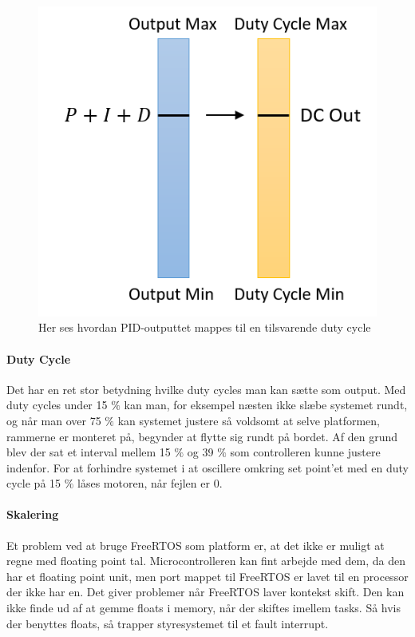 \begin{figure}
	\begin{center}
	\includegraphics[scale=0.8]{Billeder/Mapping.png}
	\end{center}		
	\caption{Her ses hvordan PID-outputtet mappes til en tilsvarende duty cycle}
	\label{fig:Mapping}	
\end{figure}
\paragraph{Duty Cycle}

Det har en ret stor betydning hvilke duty cycles man kan sætte som output. Med duty cycles under 15 $\%$ kan man, for eksempel næsten ikke slæbe systemet rundt, og når man over 75 $\%$ kan systemet justere så voldsomt at selve platformen, rammerne er monteret på, begynder at flytte sig rundt på bordet. Af den grund blev der sat et interval mellem 15 $\%$ og 39 $\%$ som controlleren kunne justere indenfor. For at forhindre systemet i at oscillere omkring set point'et med en duty cycle på 15 $\%$ låses motoren, når fejlen er 0.

\paragraph{Skalering}

Et problem ved at bruge FreeRTOS som platform er, at det ikke er muligt at regne med floating point tal. Microcontrolleren kan fint arbejde med dem, da den har et floating point unit, men port mappet til FreeRTOS er lavet til en processor der ikke har en. Det giver problemer når FreeRTOS laver kontekst skift. Den kan ikke finde ud af at gemme floats i memory, når der skiftes imellem tasks. Så hvis der benyttes floats, så trapper styresystemet til et fault interrupt.

